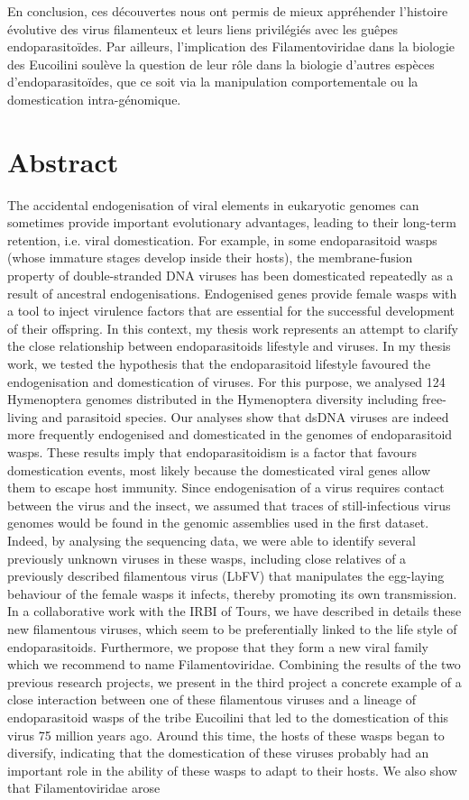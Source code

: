 En conclusion, ces découvertes nous ont permis de mieux appréhender l'histoire évolutive des virus filamenteux et leurs liens privilégiés avec les guêpes endoparasitoïdes. Par ailleurs, l'implication des Filamentoviridae dans la biologie des Eucoilini soulève la question de leur rôle dans la biologie d'autres espèces d'endoparasitoïdes, que ce soit via la manipulation comportementale ou la domestication intra-génomique.\\


\section*{Abstract}
The accidental endogenisation of viral elements in eukaryotic genomes can sometimes provide important evolutionary advantages, leading to their long-term retention, i.e. viral domestication. For example, in some endoparasitoid wasps (whose immature stages develop inside their hosts), the membrane-fusion property of double-stranded DNA viruses has been domesticated repeatedly as a result of ancestral endogenisations. Endogenised genes provide female wasps with a tool to inject virulence factors that are essential for the successful development of their offspring. In this context, my thesis work represents an attempt to clarify the close relationship between endoparasitoids lifestyle and viruses. In my thesis work, we tested the hypothesis that the endoparasitoid lifestyle favoured the endogenisation and domestication of viruses. For this purpose, we analysed 124 Hymenoptera genomes distributed in the Hymenoptera diversity including free-living and parasitoid species. Our analyses show that dsDNA viruses are indeed more frequently endogenised and domesticated in the genomes of endoparasitoid wasps. These results imply that endoparasitoidism is a factor that favours domestication events, most likely because the domesticated viral genes allow them to escape host immunity. Since endogenisation of a virus requires contact between the virus and the insect, we assumed that traces of still-infectious virus genomes would be found in the genomic assemblies used in the first dataset. Indeed, by analysing the sequencing data, we were able to identify several previously unknown viruses in these wasps, including close relatives of a previously described filamentous virus (LbFV) that manipulates the egg-laying behaviour of the female wasps it infects, thereby promoting its own transmission. In a collaborative work with the IRBI of Tours, we have described in details these new filamentous viruses, which seem to be preferentially linked to the life style of endoparasitoids. Furthermore, we propose that they form a new viral family which we recommend to name Filamentoviridae. Combining the results of the two previous research projects, we present in the third project a concrete example of a close interaction between one of these filamentous viruses and a lineage of endoparasitoid wasps of the tribe Eucoilini that led to the domestication of this virus 75 million years ago. Around this time, the hosts of these wasps began to diversify, indicating that the domestication of these viruses probably had an important role in the ability of these wasps to adapt to their hosts. We also show that Filamentoviridae arose 